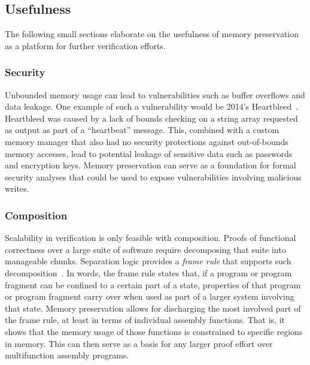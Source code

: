 \subsection{Usefulness}
The following small sections elaborate on the usefulness of memory preservation
as a platform for further verification efforts.

\subsubsection{Security}
Unbounded memory usage can lead to vulnerabilities
such as buffer overflows and data leakage.
One example of such a vulnerability would be 2014's Heartbleed~\citep{heartbleed}.
Heartbleed was caused by a lack of bounds checking on a string array
requested as output as part of a ``heartbeat'' message.
This, combined with a custom memory manager
that also had no security protections against out-of-bounds memory accesses,
lead to potential leakage of sensitive data such as passwords and encryption keys.
Memory preservation can serve as a foundation for formal security analyses%
that could be used to expose vulnerabilities involving malicious writes.

\subsubsection{Composition}\label{sse:composition}
Scalability in verification is only feasible with composition.%
%
Proofs of functional correctness over a large suite of software
require decomposing that suite into manageable chunks.
Separation logic provides a \emph{frame rule} that supports such%
%
decomposition~\citep{o2001local,reynolds2002separation,krebbers2017essence}.
In words, the frame rule states that,
if a program or program fragment can be confined to a certain part of a state,
properties of that program or program fragment carry over
when used as part of a larger system involving that state.
Memory preservation allows for discharging the most involved part of the frame rule,
at least in terms of individual assembly functions.
That is, it shows that the memory usage of those functions is constrained
to specific regions in memory.
This can then serve as a basis
for any larger proof effort over multifunction assembly programs.

